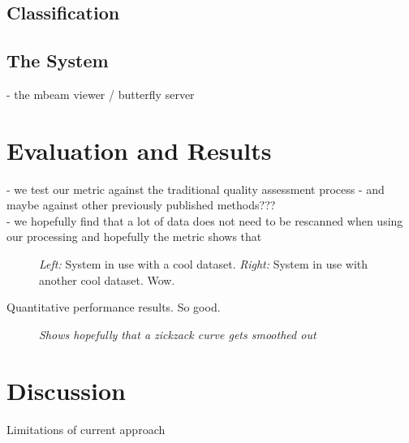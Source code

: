 \documentclass{llncs}
\begin{document}
\subsection{Classification}

\subsection{The System}
- the mbeam viewer / butterfly server

\section{Evaluation and Results}

- we test our metric against the traditional quality assessment process
- and maybe against other previously published methods???\\
- we hopefully find that a lot of data does not need to be rescanned when using our processing and hopefully the metric shows that


\begin{figure}
\caption{\emph{Left:} System in use with a cool dataset. \emph{Right:} System in use with another cool dataset. Wow.}
\end{figure}
%
%
%

\begin{table}
\caption{Quantitative performance results. So good.}
\end{table}

\begin{figure}
\caption{\emph{Shows hopefully that a zickzack curve gets smoothed out}}
\end{figure}


\section{Discussion}

Limitations of current approach



%
%
\begin{thebibliography}{}

\end{thebibliography}
\end{document}
